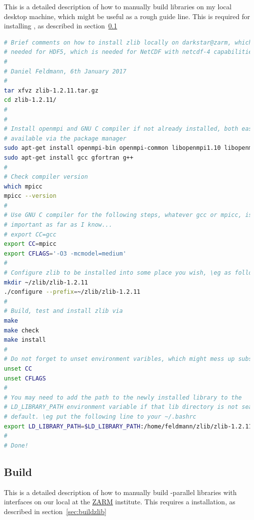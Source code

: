 \documentclass[a4paper, 11pt, DIV=11]{scrartcl}
\begin{document}
This is a detailed description of how to manually build 
libraries on my local desktop machine, which might be useful as
a rough guide line. This is required
for installing \hdf, as described in section~\ref{sec:buildhdf}
\begin{lstlisting}[language=bash]
# Brief comments on how to install zlib locally on darkstar@zarm, which is
# needed for HDF5, which is needed for NetCDF with netcdf-4 capabilities.
#
# Daniel Feldmann, 6th January 2017
#
tar xfvz zlib-1.2.11.tar.gz
cd zlib-1.2.11/
#
#
# Install openmpi and GNU C compiler if not already installed, both easily
# available via the package manager
sudo apt-get install openmpi-bin openmpi-common libopenmpi1.10 libopenmpi-dev mpi-default-bin mpi-default-dev
sudo apt-get install gcc gfortran g++
#
# Check compiler version
which mpicc
mpicc --version
#
# Use GNU C compiler for the following steps, whatever gcc or mpicc, is not
# important as far as I know...
# export CC=gcc
export CC=mpicc
export CFLAGS='-O3 -mcmodel=medium'
#
# Configure zlib to be installed into some place you wish, \eg as follows
mkdir ~/zlib/zlib-1.2.11
./configure --prefix=~/zlib/zlib-1.2.11
#
# Build, test and install zlib via
make
make check
make install
#
# Do not forget to unset environment varibles, which might mess up subsequent builds
unset CC
unset CFLAGS
#
# You may need to add the path to the newly installed library to the
# LD_LIBRARY_PATH environment variable if that lib directory is not searched by
# default. \eg put the following line to your ~/.bashrc
export LD_LIBRARY_PATH=$LD_LIBRARY_PATH:/home/feldmann/zlib/zlib-1.2.11/lib
#
# Done!
\end{lstlisting}



\subsection{Build \hdf}
\label{sec:buildhdf}
This is a detailed description of how to manually build \mpi-parallel \hdf
libraries with \fortran interfaces on our local  at the
\href{https://www.zarm.uni-bremen.de/en/}{ZARM} institute. This requires
a  installation, as described in section~\ref{sec:buildzlib}
\end{document}
